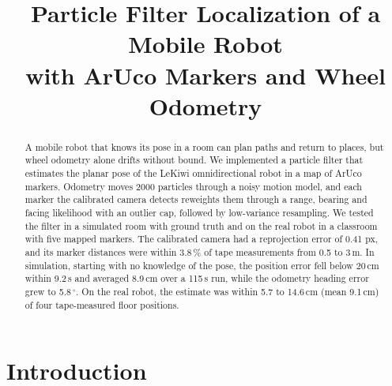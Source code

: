 \documentclass[conference]{IEEEtran}
\begin{document}
\title{Particle Filter Localization of a Mobile Robot\\with ArUco Markers and Wheel Odometry}

\author{
}

\maketitle

\begin{abstract}
A mobile robot that knows its pose in a room can plan paths and return to places, but wheel odometry alone drifts without bound. We implemented a particle filter that estimates the planar pose of the LeKiwi omnidirectional robot in a map of ArUco markers. Odometry moves 2000 particles through a noisy motion model, and each marker the calibrated camera detects reweights them through a range, bearing and facing likelihood with an outlier cap, followed by low-variance resampling. We tested the filter in a simulated room with ground truth and on the real robot in a classroom with five mapped markers. The calibrated camera had a reprojection error of 0.41 px, and its marker distances were within 3.8\,\% of tape measurements from 0.5 to 3\,m. In simulation, starting with no knowledge of the pose, the position error fell below 20\,cm within 9.2\,s and averaged 8.9\,cm over a 115\,s run, while the odometry heading error grew to 5.8\,$^\circ$. On the real robot, the estimate was within 5.7 to 14.6\,cm (mean 9.1\,cm) of four tape-measured floor positions.
\end{abstract}

\section{Introduction}
\end{document}

